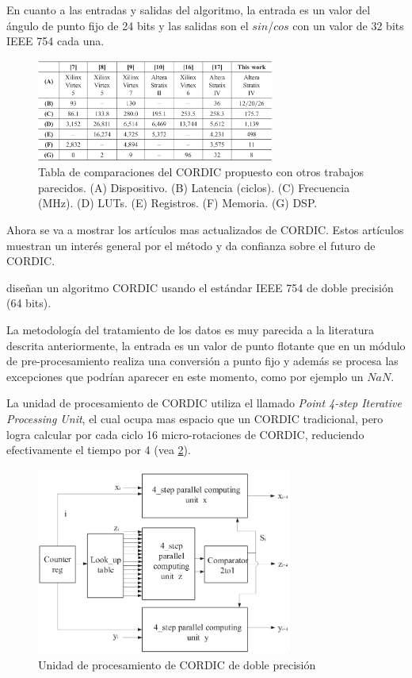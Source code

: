 En cuanto a las entradas y salidas del algoritmo, la entrada es un valor del ángulo de punto fijo de 24 bits y las salidas son el $sin$/$cos$ con un valor de 32 bits IEEE 754 cada una.

\begin{figure}[ht]
	\centering
	\includegraphics[width=0.7\textwidth]{archivos/CORDIC/2015_low-latency-fp.png}
	\caption{Tabla de comparaciones del CORDIC propuesto con otros trabajos parecidos. (A) Dispositivo. (B) Latencia (ciclos). (C) Frecuencia (MHz). (D) LUTs. (E) Registros. (F) Memoria. (G) DSP.}
	\label{graf:2015_low-latency-fp}
\end{figure}

Ahora se va a mostrar los artículos mas actualizados de CORDIC. Estos artículos muestran un interés general por el método y da confianza sobre el futuro de CORDIC.

\cite{hou_low_2019} diseñan un algoritmo CORDIC usando el estándar IEEE 754 de doble precisión (64 bits).

La metodología del tratamiento de los datos es muy parecida a la literatura descrita anteriormente, la entrada es un valor de punto flotante que en un módulo de pre-procesamiento realiza una conversión a punto fijo y además se procesa las excepciones que podrían aparecer en este momento, como por ejemplo un $NaN$.

La unidad de procesamiento de CORDIC utiliza el llamado \textit{Point 4-step Iterative Processing Unit}, el cual ocupa mas espacio que un CORDIC tradicional, pero logra calcular por cada ciclo 16 micro-rotaciones de CORDIC, reduciendo efectivamente el tiempo por 4 (vea \ref{graf:2019_4-step-64bit}).

\begin{figure}[ht]
	\centering
	\includegraphics[width=0.75\textwidth]{archivos/CORDIC/2019_4-step-64bit.png}
	\caption{Unidad de procesamiento de CORDIC de doble precisión}
	\label{graf:2019_4-step-64bit}
\end{figure}



















